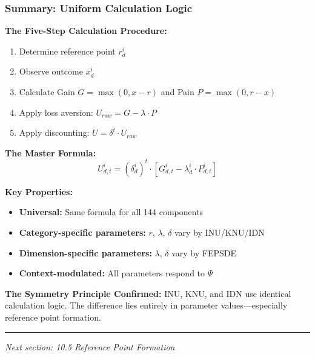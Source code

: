 \subsubsection{Summary: Uniform Calculation Logic}

\begin{tcolorbox}[colback=gray!5!white, colframe=gray!75!black, title=Section 10.4 Summary]
\textbf{The Five-Step Calculation Procedure:}
\begin{enumerate}
\item Determine reference point $r^i_d$
\item Observe outcome $x^i_d$
\item Calculate Gain $G = \max(0, x - r)$ and Pain $P = \max(0, r - x)$
\item Apply loss aversion: $U_{raw} = G - \lambda \cdot P$
\item Apply discounting: $U = \delta^t \cdot U_{raw}$
\end{enumerate}

\textbf{The Master Formula:}
$$\boxed{U^i_{d,t} = (\delta^i_d)^t \cdot \left[ G^i_{d,t} - \lambda^i_d \cdot P^i_{d,t} \right]}$$

\textbf{Key Properties:}
\begin{itemize}
\item \textbf{Universal:} Same formula for all 144 components
\item \textbf{Category-specific parameters:} $r$, $\lambda$, $\delta$ vary by INU/KNU/IDN
\item \textbf{Dimension-specific parameters:} $\lambda$, $\delta$ vary by FEPSDE
\item \textbf{Context-modulated:} All parameters respond to $\Psi$
\end{itemize}

\textbf{The Symmetry Principle Confirmed:}
INU, KNU, and IDN use identical calculation logic.
The difference lies entirely in parameter values---especially reference point formation.
\end{tcolorbox}

\vspace{1em}
\hrule
\vspace{0.5em}
\noindent\textit{Next section: 10.5 Reference Point Formation}

